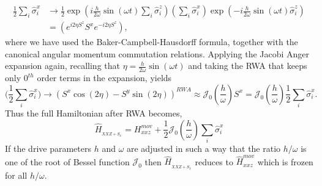 \documentclass[aps,prb,reprint,showpacs,floatfix,superscriptaddress, onecolumn, nofootinbib, 9pt]{revtex4-2}
\begin{document}
\begin{enumerate}
{			\begin{align*}
				\frac12 \sum_i \hat{\sigma}^x_i & \rightarrow\frac{1}{2} \exp \left(i \frac{h}{2 \omega} \sin (\omega t) \sum_{i} \hat{\sigma}_{i}^{z}\right)\left(\sum_{i} \hat{\sigma}_{i}^{x}\right) \exp \left(-i \frac{h}{2 \omega} \sin (\omega t) \hat{\sigma}_{i}^{z}\right) \\
				& =\left(e^{i 2 \eta S^{z}} S^{x} e^{-i 2 \eta S^{z}}\right),
			\end{align*}
			where we have used the Baker-Campbell-Hausdorff formula, together with the canonical angular momentum commutation relations. Applying the Jacobi Anger expansion again, recalling that $\eta=\frac{h}{2 \omega} \sin (\omega t)$ and taking the RWA that keeps only $0^{th}$ order terms in the expansion, yields
			\begin{equation}
				\Big(\frac12 \sum_i \hat{\sigma}^x_i\Big) \rightarrow \left(S^{x} \cos (2 \eta)-S^{y} \sin (2 \eta)\right)^{RWA} \approx \mathcal{J}_{0}\left(\frac{h}{\omega}\right) S^{x} = \mathcal{J}_{0}\left(\frac{h}{\omega}\right)\frac12\sum_i\hat{\sigma}^x_i.
			\end{equation}
		Thus the full Hamiltonian after RWA becomes,
		\begin{equation}
		\hat{H}_{_{XXZ + S_x}} = H^{mov}_{xxz} + \frac12 \mathcal{J}_{0}\left(\frac{h}{\omega}\right)\sum_i\hat{\sigma}^x_i
		\end{equation}
		If the drive parameters $h$ and $\omega$ are adjusted in such a way that the ratio $h/\omega$ is one of the root of Bessel function $\mathcal{J}_0$ then $\hat{H}_{_{XXZ + S_x}}$ reduces to $\hat{H}_{xxz}^{mov}$ which is frozen for all $h/\omega$.
				
}
\end{enumerate}
\end{document}

